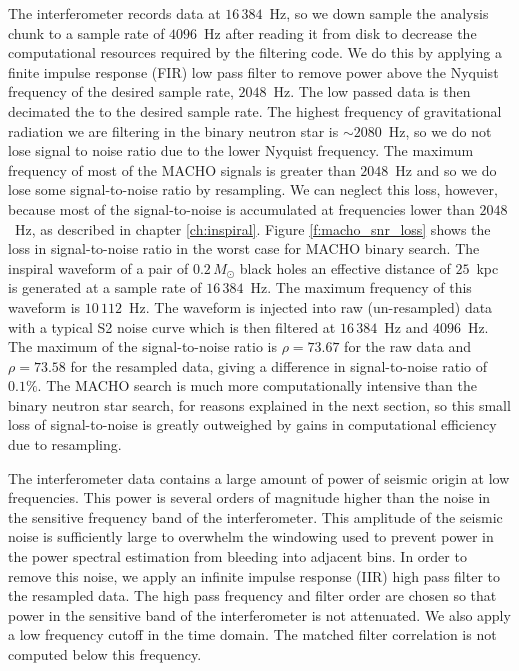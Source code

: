 The interferometer records data at $16\,384$~Hz, so we down sample the analysis
chunk to a sample rate of $4096$~Hz after reading it from disk to decrease the
computational resources required by the filtering code.  We do this by
applying a finite impulse response (FIR) low pass filter to remove power above
the Nyquist frequency of the desired sample rate, $2048$~Hz. The low passed
data is then decimated the to the desired sample rate. The highest frequency
of gravitational radiation we are filtering in the binary neutron star is
$\sim 2080$~Hz, so we do not lose signal to noise ratio due to the lower
Nyquist frequency. The maximum frequency of most of the MACHO signals is
greater than $2048$~Hz and so we do lose some signal-to-noise ratio by
resampling. We can neglect this loss, however, because most of the
signal-to-noise is accumulated at frequencies lower than $2048$~Hz, as
described in chapter \ref{ch:inspiral}. Figure \ref{f:macho_snr_loss} shows
the loss in signal-to-noise ratio in the worst case for MACHO binary search.
The inspiral waveform of a pair of $0.2\,M_\odot$ black holes an effective
distance of $25$~kpc is generated at a sample rate of $16\,384$~Hz. The maximum
frequency of this waveform is $10\,112$~Hz. The waveform is injected into raw
(un-resampled) data with a typical S2 noise curve which is then filtered at
$16\,384$~Hz and $4096$~Hz. The maximum of the signal-to-noise ratio is $\rho
= 73.67$ for the raw data and $\rho = 73.58$ for the resampled data, giving a
difference in signal-to-noise ratio of $0.1\%$. The MACHO search is much more
computationally intensive than the binary neutron star search, for reasons
explained in the next section, so this small loss of signal-to-noise is
greatly outweighed by gains in computational efficiency due to resampling.

The interferometer data contains a large amount of power of seismic origin at
low frequencies.  This power is several orders of magnitude higher than the
noise in the sensitive frequency band of the interferometer. This amplitude of
the seismic noise is sufficiently large to overwhelm the windowing used to
prevent power in the power spectral estimation from bleeding into adjacent
bins. In order to remove this noise, we apply an infinite impulse response
(IIR) high pass filter to the resampled data. The high pass frequency and
filter order are chosen so that power in the sensitive band of the
interferometer is not attenuated. We also apply a low frequency cutoff in the
time domain. The matched filter correlation is not computed below this
frequency.

